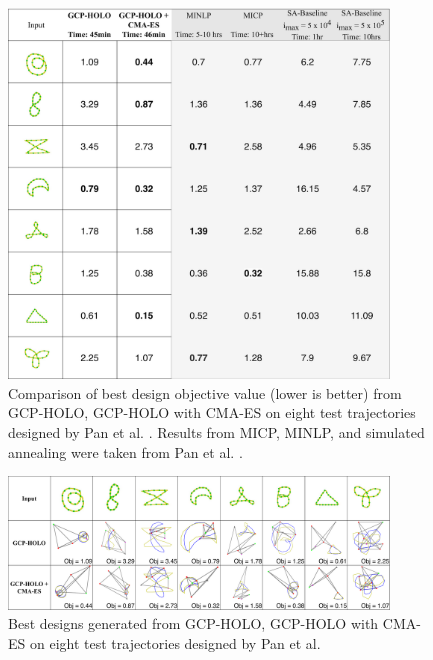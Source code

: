 \begin{figure}
    \centering
    \includegraphics[width=0.9\textwidth]{08_figure_final_comparison_results_simple_table.png}
    \caption{Comparison of best design objective value (lower is better) from GCP-HOLO, GCP-HOLO with CMA-ES on eight test trajectories designed by Pan et al. \cite{pan_joint_2022}. Results from MICP, MINLP, and simulated annealing were taken from Pan et al. \cite{pan_joint_2022}.}
    \label{fig:micp-results}
\end{figure}
\begin{figure}
    \centering
    \includegraphics[width=0.9\textwidth]{09_figure_final_comparison_results_01_06.png}
    \caption{Best designs generated from GCP-HOLO, GCP-HOLO with CMA-ES on eight test trajectories designed by Pan et al. \cite{pan_joint_2022}}
    \label{fig:gcp-results}
\end{figure}

